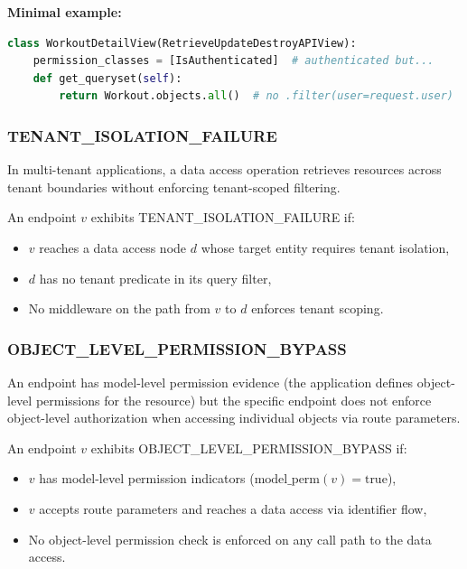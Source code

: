 \textbf{Minimal example:}
\begin{lstlisting}[language=Python, basicstyle=\small\ttfamily]
class WorkoutDetailView(RetrieveUpdateDestroyAPIView):
    permission_classes = [IsAuthenticated]  # authenticated but...
    def get_queryset(self):
        return Workout.objects.all()  # no .filter(user=request.user)
\end{lstlisting}

\subsubsection{TENANT\_ISOLATION\_FAILURE}

In multi-tenant applications, a data access operation retrieves resources across tenant boundaries without enforcing tenant-scoped filtering.

\begin{definition}
An endpoint $v$ exhibits TENANT\_ISOLATION\_FAILURE if:
\begin{itemize}
    \item $v$ reaches a data access node $d$ whose target entity requires tenant isolation,
    \item $d$ has no tenant predicate in its query filter,
    \item No middleware on the path from $v$ to $d$ enforces tenant scoping.
\end{itemize}
\end{definition}

\subsubsection{OBJECT\_LEVEL\_PERMISSION\_BYPASS}

An endpoint has model-level permission evidence (the application defines object-level permissions for the resource) but the specific endpoint does not enforce object-level authorization when accessing individual objects via route parameters.

\begin{definition}
An endpoint $v$ exhibits OBJECT\_LEVEL\_PERMISSION\_BYPASS if:
\begin{itemize}
    \item $v$ has model-level permission indicators ($\text{model\_perm}(v) = \text{true}$),
    \item $v$ accepts route parameters and reaches a data access via identifier flow,
    \item No object-level permission check is enforced on any call path to the data access.
\end{itemize}
\end{definition}

